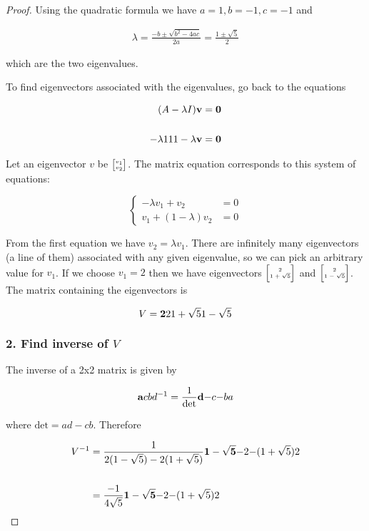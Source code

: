 \begin{proof}
Using the quadratic formula we have $a=1, b=-1, c=-1$ and

\begin{align*}
\lambda
= \frac{-b \pm \sqrt{b^2 - 4ac}}{2a}
= \frac{1 \pm \sqrt{5}}{2}
\end{align*}

which are the two eigenvalues.

To find eigenvectors associated with the eigenvalues, go back to the equations

\begin{align*}
(A - \lambda I)\mathbf v &= \mathbf 0
\\
\\
\mathbf{-\lambda}{1}
    {1       }{1 - \lambda} \mathbf v &= \mathbf 0
\end{align*}

Let an eigenvector $v$ be $\tiny{\begin{bmatrix}v_1\\v_2\end{bmatrix}}$. The matrix equation corresponds
to this system of equations:

$$
\begin{cases}
-\lambda v_1 + v_2               &= 0\\
v_1          + (1 - \lambda) v_2 &= 0
\end{cases}
$$

From the first equation we have $v_2 = \lambda v_1$. There are infinitely many
eigenvectors (a line of them) associated with any given eigenvalue, so we can
pick an arbitrary value for $v_1$. If we choose $v_1=2$ then we have
eigenvectors $\tiny{\begin{bmatrix}2\\1+\sqrt 5\end{bmatrix}}$ and $\tiny{\begin{bmatrix}2\\1-\sqrt 5\end{bmatrix}}$. The matrix
containing the eigenvectors is

$$
V = \mathbf{2          }{2          }
        {1 + \sqrt 5}{1 - \sqrt 5}
$$


\subsubsection{2. Find inverse of $V$}

The inverse of a 2x2 matrix is given by

$$
\mathbf{a}{c}
    {b}{d} ^ {-1}
=
\frac{1}{\text{det}} \mathbf{d}{-c}
                         {-b}{a}
$$

where $\text{det} = ad - cb$. Therefore

\begin{align*}
V^{-1}
&= \frac{1}{2(1 - \sqrt 5) - 2(1 + \sqrt 5)} \mathbf{1 - \sqrt 5 }{-2}
                                                 {-(1 + \sqrt 5)}{2}
\\\\
&= \frac{-1}{4\sqrt 5} \mathbf{1 - \sqrt 5 }{-2}
                           {-(1 + \sqrt 5)}{2}
\end{align*}



\end{proof}
